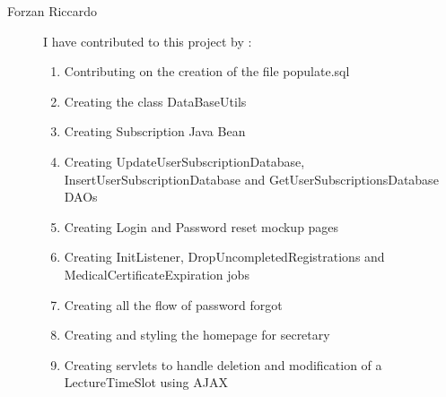 \begin{description}
	\item[Forzan Riccardo] I have contributed to this project by :
	\begin{flushleft}
        \begin{enumerate}
            \item Contributing on the creation of the file populate.sql
            \item Creating the class DataBaseUtils
            \item Creating Subscription Java Bean
            \item Creating UpdateUserSubscriptionDatabase, InsertUserSubscriptionDatabase and GetUserSubscriptionsDatabase DAOs
            \item Creating Login and Password reset mockup pages
            \item Creating InitListener, DropUncompletedRegistrations and MedicalCertificateExpiration jobs
            \item Creating all the flow of password forgot
            \item Creating and styling the homepage for secretary
            \item Creating servlets to handle deletion and modification of a LectureTimeSlot using AJAX
        \end{enumerate}
    \end{flushleft}
	

\end{description}

